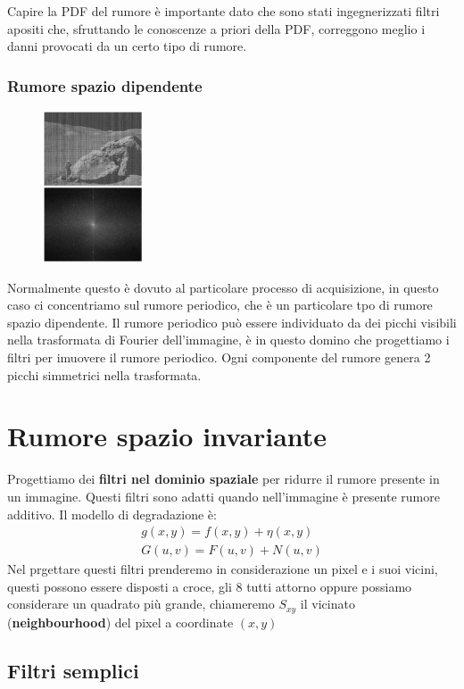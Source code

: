 Capire la PDF del rumore è importante dato che sono stati ingegnerizzati  filtri apositi che, sfruttando le conoscenze a priori della PDF, correggono meglio i danni provocati da un certo tipo di rumore.

\subsubsection{Rumore spazio dipendente} 
\begin{figure}
	\vspace{-.6cm}
	\centering
	\includegraphics[width=.95\linewidth, height=4.5cm]{Picture/Periodic_Noise}
\end{figure}
Normalmente questo è dovuto al particolare processo di acquisizione, in questo caso ci concentriamo sul rumore periodico, che è un particolare tpo di rumore spazio dipendente. Il rumore periodico può essere individuato da dei picchi visibili nella trasformata di Fourier dell'immagine, è in questo domino che progettiamo i filtri per imuovere il rumore periodico. Ogni componente del rumore genera 2 picchi simmetrici nella trasformata.
\newpage

\section{Rumore spazio invariante}
Progettiamo dei \textbf{filtri nel dominio spaziale} per ridurre il rumore presente in un immagine. Questi filtri sono adatti quando nell'immagine è presente rumore additivo. Il modello di degradazione è:
\begin{gather}
	g(x,y) = f(x,y) + \eta(x,y)\\
	G(u,v) = F(u,v) + N(u,v)
\end{gather}
Nel prgettare questi filtri prenderemo in considerazione un pixel e i suoi vicini, questi possono essere disposti a croce, gli  8 tutti attorno oppure possiamo considerare un quadrato più grande, chiameremo $S_{xy}$ il vicinato (\textbf{neighbourhood}) del pixel a coordinate $(x,y)$
\subsection{Filtri semplici}
